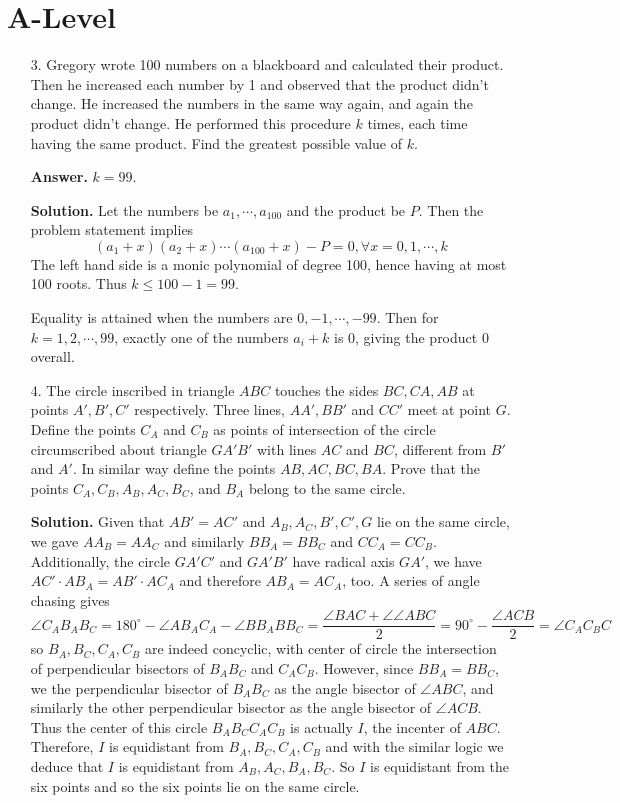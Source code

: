 \documentclass[11pt,a4paper]{article}
\begin{document}
\section*{A-Level}
\begin{enumerate}
	\item[3.] 
	Gregory wrote 100 numbers on a blackboard and calculated their product. Then he increased each number by 1 and observed that the product didn’t change. He increased the numbers in the same way again, and again the product didn’t change. He performed this procedure $k$ times, each time having the same product. Find the greatest possible value of $k$. 
	
	\textbf{Answer.} $k=99$. 
	
	\textbf{Solution.} Let the numbers be $a_1, \cdots , a_{100}$ and the product be $P$. Then the problem statement implies 
	\[
	(a_1+x)(a_2+x)\cdots(a_{100}+x)-P=0, \forall x=0, 1, \cdots , k
	\]
	The left hand side is a monic polynomial of degree 100, hence having at most 100 roots. Thus $k\le 100-1=99$. 
	
	Equality is attained when the numbers are $0, -1, \cdots , -99$. Then for $k=1, 2, \cdots , 99$, exactly one of the numbers $a_i+k$ is 0, giving the product 0 overall. 
	
	\item[4.] 
	The circle inscribed in triangle $ABC$ touches the sides $BC, CA, AB$ at points $A', B', C'$ respectively. Three lines, $AA', BB'$ and $CC'$ meet at point $G$. Define the points $C_A$ and $C_B$ as points of intersection of the circle circumscribed about triangle $GA'B'$ with lines $AC$ and $BC$, different from $B'$ and $A'$. In similar way define the points $AB, AC, BC, BA$. Prove that the points $C_A, C_B, A_B, A_C, B_C$, and $B_A$ belong to the same circle.
	
	\textbf{Solution.} Given that $AB'=AC'$ and $A_B, A_C, B', C', G$ lie on the same circle, we gave $AA_B=AA_C$ and similarly $BB_A=BB_C$ and $CC_A=CC_B$. Additionally, the circle $GA'C'$ and $GA'B'$ have radical axis $GA'$, we have $AC'\cdot AB_A=AB'\cdot AC_A$ and therefore $AB_A=AC_A$, too. 
	A series of angle chasing gives 
	\[
	\angle C_AB_AB_C=180^{\circ}-\angle AB_AC_A-\angle BB_ABB_C = \frac{\angle BAC+\angle \angle ABC}{2}=90^{\circ} - \frac{\angle ACB}{2}=\angle C_AC_BC
	\]
	so $B_A, B_C, C_A, C_B$ are indeed concyclic, with center of circle the intersection of perpendicular bisectors of $B_AB_C$ and $C_AC_B$. However, since $BB_A=BB_C$, we the perpendicular bisector of $B_AB_C$ as the angle bisector of $\angle ABC$, and similarly the other perpendicular bisector as the angle bisector of $\angle ACB$. Thus the center of this circle $B_AB_CC_AC_B$ is actually $I$, the incenter of $ABC$. Therefore, $I$ is equidistant from $B_A, B_C, C_A, C_B$ and with the similar logic we deduce that $I$ is equidistant from $A_B, A_C, B_A, B_C$. So $I$ is equidistant from the six points and so the six points lie on the same circle. 
	

\end{enumerate}
\end{document}
